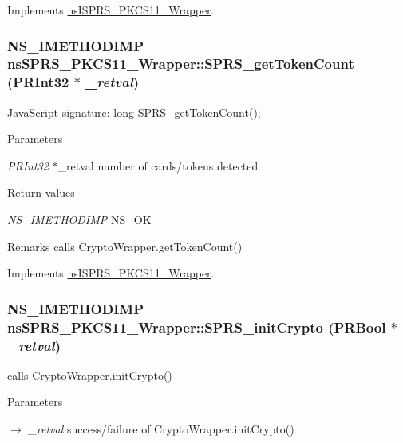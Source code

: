 Implements \hyperlink{classnsISPRS__PKCS11__Wrapper}{nsISPRS\_\-PKCS11\_\-Wrapper}.\hypertarget{classnsSPRS__PKCS11__Wrapper_a91869f39a842b967711d242ce95f9637}{
\subsubsection[{SPRS\_\-getTokenCount}]{\setlength{\rightskip}{0pt plus 5cm}NS\_\-IMETHODIMP nsSPRS\_\-PKCS11\_\-Wrapper::SPRS\_\-getTokenCount (PRInt32 $\ast$ {\em \_\-retval})}}
\label{classnsSPRS__PKCS11__Wrapper_a91869f39a842b967711d242ce95f9637}
JavaScript signature: long SPRS\_\-getTokenCount(); 
\begin{DoxyParams}{Parameters}
\item[{\em PRInt32}]$\ast$\_\-retval number of cards/tokens detected \end{DoxyParams}

\begin{DoxyRetVals}{Return values}
\item[{\em NS\_\-IMETHODIMP}]NS\_\-OK \end{DoxyRetVals}
\begin{DoxyRemark}{Remarks}
calls CryptoWrapper.getTokenCount() 
\end{DoxyRemark}


Implements \hyperlink{classnsISPRS__PKCS11__Wrapper}{nsISPRS\_\-PKCS11\_\-Wrapper}.\hypertarget{classnsSPRS__PKCS11__Wrapper_a474e38625c00c8a61bb890e2db670682}{
\subsubsection[{SPRS\_\-initCrypto}]{\setlength{\rightskip}{0pt plus 5cm}NS\_\-IMETHODIMP nsSPRS\_\-PKCS11\_\-Wrapper::SPRS\_\-initCrypto (PRBool $\ast$ {\em \_\-retval})}}
\label{classnsSPRS__PKCS11__Wrapper_a474e38625c00c8a61bb890e2db670682}


calls CryptoWrapper.initCrypto() 
\begin{DoxyParams}{Parameters}
\item[\mbox{$\rightarrow$} {\em \_\-retval}]success/failure of CryptoWrapper.initCrypto() \end{DoxyParams}

